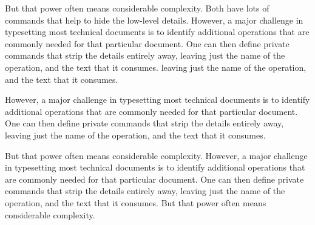 

\startcanonpage{28pc}
\typosize[16/18]
\noindent But that power often means considerable complexity. 
Both have lots of commands that help to hide the low-level details. 
However, a major challenge in typesetting most technical documents is to identify additional operations that are commonly needed for that particular document. One can then define private commands that strip the details entirely away, leaving just the name of the operation, and the text that it consumes. leaving just the name of the operation, and the text that it consumes.

However, a major challenge in typesetting most technical documents is to identify additional operations that are commonly needed for that particular document. One can then define private commands that strip the details entirely away, leaving just the name of the operation, and the text that it consumes.

{But that power often means considerable complexity. 
However, a major challenge in typesetting most technical documents is to identify additional operations that are commonly needed for that particular document. One can then define private commands that strip the details entirely away, leaving just the name of the operation, and the text that it consumes. But that power often means considerable complexity. \parfillskip=0pt\par}
\vfil

\stopcanonpage



